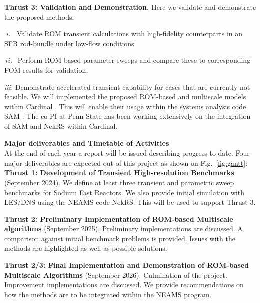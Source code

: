\textbf{Thrust 3: Validation and Demonstration.}
Here we validate and demonstrate the proposed methods.
\\[-5ex]
\begin{description}
\item{$\; i.\; \;$}
Validate ROM transient calculations with high-fidelity counterparts
in an SFR rod-bundle under low-flow conditions.
\\[-4ex]
\item{$\, ii. \,\;$}
Perform ROM-based parameter sweeps and compare these to corresponding
FOM results for validation.
\\[-4ex]
\item{\em iii.}
Demonstrate accelerated transient capability for cases that are currently not
feasible. We will implemented the proposed ROM-based and multiscale models within Cardinal \cite{cardinal}. This will enable their usage within the systems analysis code SAM \cite{hu2021}. The co-PI at Penn State has been working extensively on the integration of SAM and NekRS within Cardinal.
\\[-3ex]
\end{description}

\textbf{Major deliverables and Timetable of Activities} \\
At the end of each year a report will be issued describing progress to date.
Four major deliverables are expected out of this project as shown on
Fig.~\ref{fig:gantt}: \\

\vspace*{-.10in}
\noindent \textbf{Thrust 1: Development of Transient High-resolution
Benchmarks} (September 2024). We define at least three transient and parametric
sweep benchmarks for Sodium Fast Reactors. We also provide initial simulation
with LES/DNS using the NEAMS code NekRS. This will be used to support Thrust 3.

\noindent \textbf{Thrust 2: Preliminary Implementation of ROM-based Multiscale
algorithms} (September 2025). Preliminary implementations are discussed. A
comparison against initial benchmark problems is provided. Issues with the
methods are highlighted as well as possible solutions.

\noindent \textbf{Thrust 2/3: Final Implementation and Demonstration of
ROM-based Multiscale Algorithms} (September 2026).
Culmination of the project. Improvement implementations are discussed. We
provide recommendations on how the methods are to be integrated within the
NEAMS program.

